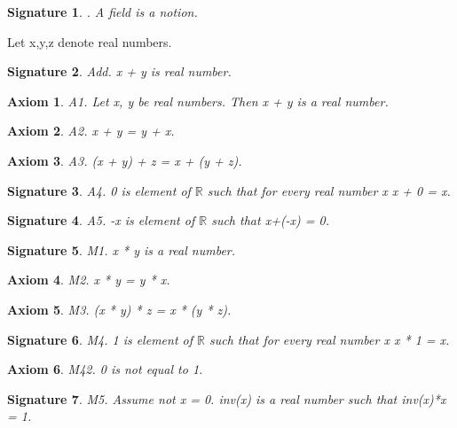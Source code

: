 \documentclass{article}
\newenvironment{forthel}{\begin{leftbar}}{\end{leftbar}}
\newtheorem{axiom}{Axiom}
\newtheorem{signature}{Signature}
\begin{document}
\begin{forthel}

\begin{signature}. A field is a notion.

\end{signature}

Let x,y,z denote real numbers.

\begin{signature} Add. x + y is real number.

\end{signature}
\begin{axiom} A1. Let x, y be real numbers. Then x + y is a real number.

\end{axiom}
\begin{axiom} A2. x + y = y + x.

\end{axiom}
\begin{axiom} A3. (x + y) + z = x + (y + z). 

\end{axiom}
\begin{signature} A4. 0 is element of $\mathbb{R}$ such that for every real number x x + 0 = x.

\end{signature}
\begin{signature} A5. -x is element of $\mathbb{R}$ such that x+(-x) = 0.

\end{signature}

\begin{signature} M1. x * y is a real number.

\end{signature}
\begin{axiom} M2. x * y = y * x.

\end{axiom}
\begin{axiom} M3. (x * y) * z = x * (y * z).

\end{axiom}
\begin{signature} M4. 1 is element of $\mathbb{R}$ such that for every real number x x * 1 = x.

\end{signature}
\begin{axiom} M42. 0 is not equal to 1.

\end{axiom}
\begin{signature} M5. Assume not x = 0. inv(x) is a real number such that inv(x)*x = 1.


\end{signature}
\end{forthel}
\end{document}
